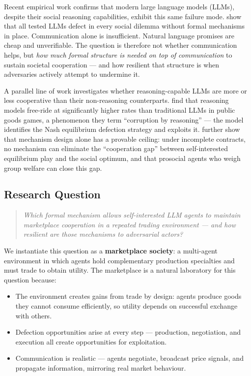 \documentclass{article}
\begin{document}
Recent empirical work confirms that modern large language models (LLMs), despite their social reasoning capabilities, exhibit this same failure mode. \citet{coopeval} show that all tested LLMs defect in every social dilemma without formal mechanisms in place. Communication alone is insufficient. Natural language promises are cheap and unverifiable. The question is therefore not whether communication helps, but \textit{how much formal structure is needed on top of communication} to sustain societal cooperation --- and how resilient that structure is when adversaries actively attempt to undermine it.

A parallel line of work investigates whether reasoning-capable LLMs are more or less cooperative than their non-reasoning counterparts. \citet{piedrahita2025} find that reasoning models free-ride at significantly higher rates than traditional LLMs in public goods games, a phenomenon they term ``corruption by reasoning'' --- the model identifies the Nash equilibrium defection strategy and exploits it. \citet{huang2025} further show that mechanism design alone has a provable ceiling: under incomplete contracts, no mechanism can eliminate the ``cooperation gap'' between self-interested equilibrium play and the social optimum, and that prosocial agents who weigh group welfare can close this gap.

\subsection{Research Question}

\begin{quote}
\textit{Which formal mechanism allows self-interested LLM agents to maintain marketplace cooperation in a repeated trading environment --- and how resilient are those mechanisms to adversarial actors?}
\end{quote}

We instantiate this question as a \textbf{marketplace society}: a multi-agent environment in which agents hold complementary production specialties and must trade to obtain utility. The marketplace is a natural laboratory for this question because:

\begin{itemize}
  \item The environment creates gains from trade by design: agents produce goods they cannot consume efficiently, so utility depends on successful exchange with others.
  \item Defection opportunities arise at every step --- production, negotiation, and execution all create opportunities for exploitation.
  \item Communication is realistic --- agents negotiate, broadcast price signals, and propagate information, mirroring real market behaviour.
\end{itemize}
\end{document}

